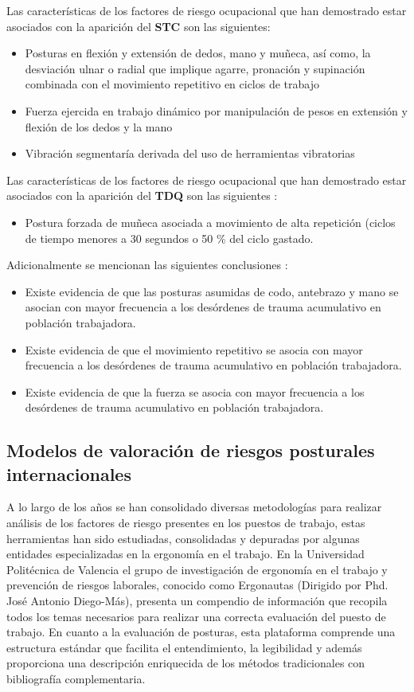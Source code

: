 Las características de los factores de riesgo ocupacional que han demostrado estar asociados con la aparición del \textbf{STC} son las siguientes: \parencite[45]{MinisteriodeProteccionSocialdeColombia2006GuiaSuperiores}
\begin{itemize}
\item Posturas en flexión y extensión de dedos, mano y muñeca, así como, la desviación ulnar o radial que implique agarre, pronación y supinación combinada con el movimiento repetitivo en ciclos de trabajo
\item Fuerza ejercida en trabajo dinámico por manipulación de pesos en extensión y flexión de los dedos y la mano
\item Vibración segmentaría derivada del uso de herramientas vibratorias
\end{itemize}
Las características de los factores de riesgo ocupacional que han demostrado estar asociados con la aparición del \textbf{TDQ} son las siguientes \parencite[45]{MinisteriodeProteccionSocialdeColombia2006GuiaSuperiores}:
\begin{itemize}
\item Postura forzada de muñeca asociada a movimiento de alta repetición (ciclos de tiempo menores a 30 segundos o 50 \% del ciclo gastado.
\end{itemize}
Adicionalmente se mencionan las siguientes conclusiones \parencite[46]{MinisteriodeProteccionSocialdeColombia2006GuiaSuperiores}:
\begin{itemize}
\item Existe evidencia de que las posturas asumidas de codo, antebrazo y mano se asocian con mayor frecuencia a los desórdenes de trauma acumulativo en población trabajadora.
\item Existe evidencia de que el movimiento repetitivo se asocia con mayor frecuencia a los desórdenes de trauma acumulativo en población trabajadora.
\item Existe evidencia de que la fuerza se asocia con mayor frecuencia a los desórdenes de trauma acumulativo en población trabajadora.
\end{itemize}
\subsection{Modelos de valoración de riesgos posturales internacionales}
A lo largo de los años se han consolidado diversas metodologías para realizar análisis de los factores de riesgo presentes en los puestos de trabajo, estas herramientas han sido estudiadas, consolidadas y depuradas por algunas entidades especializadas en la ergonomía en el trabajo. En la Universidad Politécnica de Valencia el grupo de investigación de ergonomía en el trabajo y prevención de riesgos laborales, conocido como Ergonautas (Dirigido por Phd. José Antonio Diego-Más), presenta un compendio de información que recopila todos los temas necesarios para realizar una correcta evaluación del puesto de trabajo. En cuanto a la evaluación de posturas, esta plataforma comprende una estructura estándar que facilita el entendimiento, la legibilidad y además proporciona una descripción enriquecida de los métodos tradicionales con bibliografía complementaria. 

